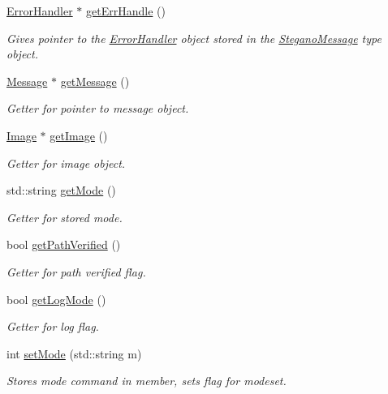 \begin{DoxyCompactItemize}
\mbox{\hyperlink{classErrorHandler}{Error\+Handler}} $\ast$ \mbox{\hyperlink{classSteganoMessage_a0134757a8c79caa9dca9bcce0686d1ef}{get\+Err\+Handle}} ()
\begin{DoxyCompactList}\small\item\em Gives pointer to the \mbox{\hyperlink{classErrorHandler}{Error\+Handler}} object stored in the \mbox{\hyperlink{classSteganoMessage}{Stegano\+Message}} type object. \end{DoxyCompactList}\item 
\mbox{\hyperlink{classMessage}{Message}} $\ast$ \mbox{\hyperlink{classSteganoMessage_ad29978e925056ad70dc5c45b1e1681eb}{get\+Message}} ()
\begin{DoxyCompactList}\small\item\em Getter for pointer to message object. \end{DoxyCompactList}\item 
\mbox{\hyperlink{classImage}{Image}} $\ast$ \mbox{\hyperlink{classSteganoMessage_a2e3ad705a0219edfd2150f3f7931979c}{get\+Image}} ()
\begin{DoxyCompactList}\small\item\em Getter for image object. \end{DoxyCompactList}\item 
std\+::string \mbox{\hyperlink{classSteganoMessage_a7dc660e6d2c8f162636f789cfedde67e}{get\+Mode}} ()
\begin{DoxyCompactList}\small\item\em Getter for stored mode. \end{DoxyCompactList}\item 
bool \mbox{\hyperlink{classSteganoMessage_ace172144e49a4da69b890958b3b8089b}{get\+Path\+Verified}} ()
\begin{DoxyCompactList}\small\item\em Getter for path verified flag. \end{DoxyCompactList}\item 
bool \mbox{\hyperlink{classSteganoMessage_ab560ec6c0d3e99c19822ca1119a68b92}{get\+Log\+Mode}} ()
\begin{DoxyCompactList}\small\item\em Getter for log flag. \end{DoxyCompactList}\item 
int \mbox{\hyperlink{classSteganoMessage_a3e06a73baa5744b5eb9152f4ae65f458}{set\+Mode}} (std\+::string m)
\begin{DoxyCompactList}\small\item\em Stores mode command in member, sets flag for modeset. \end{DoxyCompactList}\item 

\end{DoxyCompactItemize}
